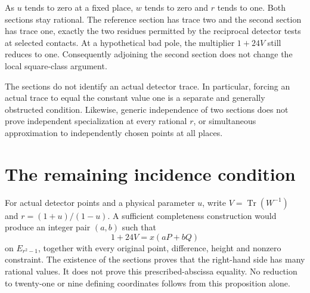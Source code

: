 \documentclass[11pt,a4paper]{article}
\begin{document}
As $u$ tends to zero at a fixed place, $w$ tends to zero and
$r$ tends to one. Both sections stay rational. The reference section
has trace two and the second section has trace one, exactly the two
residues permitted by the reciprocal detector tests at selected
contacts. At a hypothetical bad pole, the multiplier $1+24V$
still reduces to one. Consequently adjoining the second section
does not change the local square-class argument.

The sections do not identify an actual detector trace. In particular,
forcing an actual trace to equal the constant value one is a separate
and generally obstructed condition. Likewise, generic independence
of two sections does not prove independent specialization at every
rational $r$, or simultaneous approximation to independently chosen
points at all places.

\section*{The remaining incidence condition}

For actual detector points and a physical parameter $u$, write
$V=\operatorname{Tr}(W^{-1})$ and $r=(1+u)/(1-u)$.
A sufficient completeness construction would produce an integer
pair $(a,b)$ such that
\[
                    1+24V=x(aP+bQ)
\]
on $E_{r^2-1}$, together with every original point, difference,
height and nonzero constraint. The existence of the sections proves
that the right-hand side has many rational values. It does not
prove this prescribed-abscissa equality. No reduction to twenty-one
or nine defining coordinates follows from this proposition alone.
\end{document}
